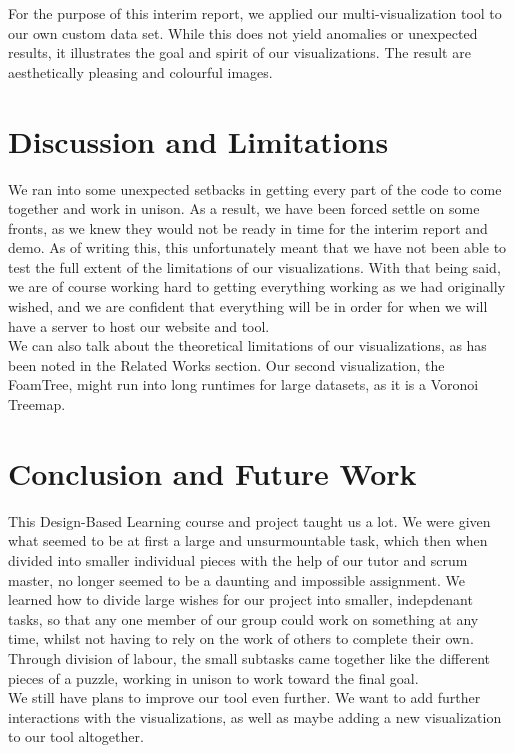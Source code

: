\documentclass[journal, 9pt]{vgtc}                %
\begin{document}
For the purpose of this interim report, we applied our multi-visualization tool to our own custom data set. While this does not yield anomalies or unexpected results,
it illustrates the goal and spirit of our visualizations. 
The result are aesthetically pleasing and colourful images.


\section{Discussion and Limitations}

We ran into some unexpected setbacks in getting every part of the code to come together and work in unison. As a result, we have been forced settle on some fronts,
as we knew they would not be ready in time for the interim report and demo. As of writing this, this unfortunately meant that we have not been able to test the full 
extent of the limitations of our visualizations. With that being said, we are of course working hard to getting everything working as we had originally wished, and we are
confident that everything will be in order for when we will have a server to host our website and tool.\\
We can also talk about the theoretical limitations of our visualizations, as has been noted in the Related Works section. Our second visualization, the FoamTree,
might run into long runtimes for large datasets, as it is a Voronoi Treemap.

\section{Conclusion and Future Work}

This Design-Based Learning course and project taught us a lot. We were given what seemed to be at first a large and unsurmountable task, which then when divided
into smaller individual pieces with the help of our tutor and scrum master, no longer seemed to be a daunting and impossible assignment. We learned how to divide
large wishes for our project into smaller, indepdenant tasks, so that any one member of our group could work on something at any time, whilst not having to rely on
the work of others to complete their own. Through division of labour, the small subtasks came together like the different pieces of a puzzle, working in unison to work
toward the final goal.\\
We still have plans to improve our tool even further. We want to add further interactions with the visualizations, as well as maybe adding a new visualization to our
tool altogether.

\newpage

%

%
%
%


\end{document}
